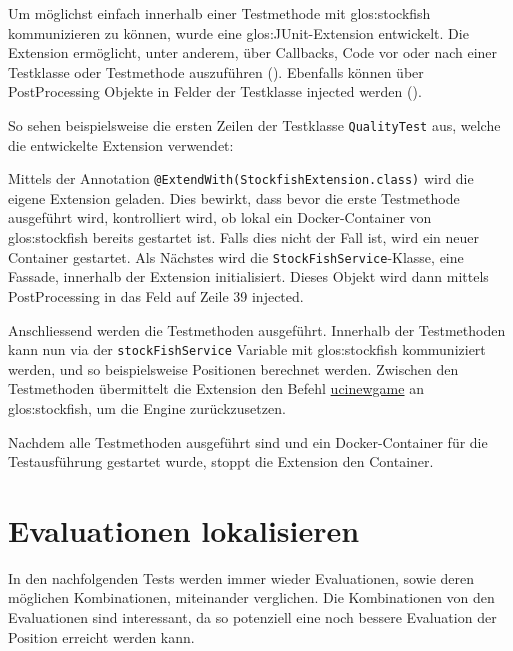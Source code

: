 Um möglichst einfach innerhalb einer Testmethode mit \gls{glos:stockfish} kommunizieren zu können, wurde
eine \gls{glos:JUnit}-Extension entwickelt. Die Extension ermöglicht, unter anderem, über Callbacks, Code
vor oder nach einer Testklasse oder Testmethode auszuführen (\cite{junitCallbacks}). Ebenfalls können über PostProcessing Objekte in Felder der
Testklasse injected werden (\cite{junitExtensionRegistration}).

So sehen beispielsweise die ersten Zeilen der Testklasse \texttt{QualityTest} aus, welche die entwickelte Extension verwendet:



Mittels der Annotation \texttt{@ExtendWith(StockfishExtension.class)} wird die eigene Extension geladen. Dies bewirkt,
dass bevor die erste Testmethode ausgeführt wird, kontrolliert wird, ob lokal ein Docker-Container von \gls{glos:stockfish} bereits
gestartet ist. Falls dies nicht der Fall ist, wird ein neuer Container gestartet.
Als Nächstes wird die \texttt{StockFishService}-Klasse, eine Fassade, innerhalb der Extension initialisiert. Dieses Objekt
wird dann mittels PostProcessing in das Feld auf Zeile 39 injected.

Anschliessend werden die Testmethoden ausgeführt. Innerhalb der Testmethoden kann nun via der \texttt{stockFishService}
Variable mit \gls{glos:stockfish} kommuniziert werden, und so beispielsweise Positionen berechnet werden.
Zwischen den Testmethoden übermittelt die Extension den Befehl
\href{https://official-stockfish.github.io/docs/stockfish-wiki/UCI-\&-Commands.html\#ucinewgame}{ucinewgame} an \gls{glos:stockfish},
um die Engine zurückzusetzen.

Nachdem alle Testmethoden ausgeführt sind und ein Docker-Container für die Testausführung gestartet wurde, stoppt
die Extension den Container.

\section{Evaluationen lokalisieren}
\label{sec:evalpotenzmenge}

In den nachfolgenden Tests werden immer wieder Evaluationen, sowie deren möglichen Kombinationen, miteinander verglichen.
Die Kombinationen von den Evaluationen sind interessant, da so potenziell eine noch bessere Evaluation der Position
erreicht werden kann.


